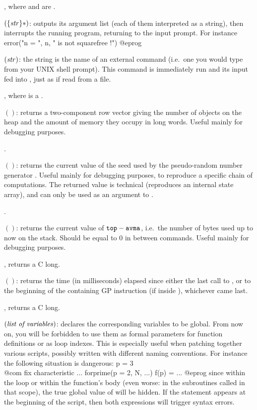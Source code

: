 , where  and  are
.

$(\{\hbox{\it str\/}\}*)$: outputs its argument list (each of
them interpreted as a string), then interrupts the running  program,
returning to the input prompt. For instance
\bprog
error("n = ", n, " is not squarefree !")
@eprog\noindent

$(\hbox{\it str\/})$: the string  is the name
of an external command (i.e.~one you would type from your UNIX shell prompt).
This command is immediately run and its input fed into , just as if read
from a file.

, where  is a .

$()$: returns a two-component row vector giving the
number of objects on the heap and the amount of memory they occupy in long
words. Useful mainly for debugging purposes.

.

$()$: returns the current value of the seed used by the
pseudo-random number generator . Useful mainly for debugging
purposes, to reproduce a specific chain of computations. The returned value
is technical (reproduces an internal state array), and can only be used as an
argument to .

.

$()$: returns the current value of
${\tt top}-{\tt avma}$, i.e.~the number of bytes used up to now on the stack.
Should be equal to $0$ in between commands. Useful mainly for debugging
purposes.

, returns a C long.

$()$: returns the time (in milliseconds) elapsed since
either the last call to , or to the beginning of the containing
GP instruction (if inside ), whichever came last.

, returns a C long.

$(\hbox{\it list of variables\/})$: \label{se:global}
declares the corresponding variables to be global. From now on, you will be
forbidden to use them as formal parameters for function definitions or as
loop indexes. This is especially useful when patching together various
scripts, possibly written with different naming conventions. For instance the
following situation is dangerous:
%
\bprog
p = 3   \\@com fix characteristic
...
forprime(p = 2, N, ...)
f(p) = ...
@eprog\noindent
since within the loop or within the function's body (even worse: in the
subroutines called in that scope), the true global value of  will be
hidden. If the statement  appears at the beginning of
the script, then both expressions will trigger syntax errors.

